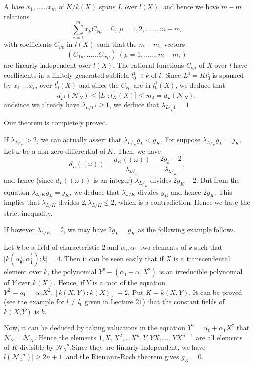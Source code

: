 A base $x_1, \ldots \ldots x_m$ of $K/{k(X)}$ spans $L$ over $l(X)$,
and hence we have $m - m_\circ$ relations 
$$
\sum^{m}_{\nu =1} x_\nu C_{\nu \mu} = 0, ~ \mu = 1, 2, \ldots\ldots , m-m_\circ
$$
with coefficients $C_{\nu \mu}$ in $l(X)$ such that the $m - m_\circ$
vectors 
$$
(C_{1 \mu}, \ldots\ldots C_{m \mu})~(\mu =1, \ldots\ldots ,
m-m_\circ)
$$ 
are linearly independent over $l(X)$. The rational
functions $C_{\nu \mu}$ of $X$ over $l$ have coefficients in a
finitely generated subfield $l^1_0 \supset k$ of $l$. Since $L^1 =
Kl^1_0$ is spanned by $x_1, \ldots x_m$ over $l^1_0(X)$ and
since the $C_{\nu \mu} $ are in $l^1_0(X)$, we deduce that 
$$
d_{L^1}(\mathscr{N}_X) \leq \bigg[L^1 : l^1_X (X)\bigg] \leq
m_0 = d_L (\mathscr{N}_X), 
$$
and\pageoriginale since we already have $\lambda_{L/L^1} \geq 1$, we deduce that
$\lambda_{L/_L1} = 1$. 

Our theorem is completely proved.
\begin{remark*}
  If $\lambda_{L/_K} > 2$, we can actually assert that
  $\lambda_{L/_{K}} g_L < g_K$. For suppose $\lambda_{L/_K} g_L =
  g_K$. Let $\omega$ be a non-zero differential of $K$. Then, we have 
  $$
  d_L((\omega)) = \frac{d_K((\omega))}{\lambda_{L/_K}}= \frac{2
    g_k -2}{\lambda_{L/_K}}, 
  $$
  and hence (since $d_L ((\omega))$ is an integer) $\lambda_{L/_K}$
  divides $2g_K -2$. But from the equation $\lambda_{L/K}g_L = g_K$,
  we deduce that $\lambda_{L/K}$ divides $g_K$ and hence $2g_K$. This
  implies that $\lambda_{L/K}$ divides $2, \lambda_{L/K} \leq 2$,
  which is a contradiction. Hence we have the strict inequality. 
\end{remark*}

If however $\lambda_{L/K} = 2$, we may have $2g_L = g_K$ as the
following example follows. 

Let $k$ be a field of characteristic $2$ and $\alpha_\circ, \alpha_1$
two elements of $k$ such that $\bigg [k \left(\alpha^{\frac{1}{2}}_0,
  \alpha^{\frac{1}{2}}_1\right) : k \bigg] = 4$. Then it can be seen easily
that if $X$ is a transcendental element over $k$, the polynomial $Y^2
- (\alpha_1 + \alpha_1 X^2)$ is an irreducible polynomial of $Y$ over
$k(X)$. Hence, if $Y$ is a root of the equation $Y^2 = \alpha_0 +
\alpha_1 X^2, [k (X, Y) : k(X)] = 2$. Put $K = k(X, Y)$. It can be
proved (see the example for $l \neq l_0 $ given in Lecture $21$)
that the constant fields of $k(X, Y)$ is $k$.  

Now, it can be deduced by taking valuations in the equation $Y^2 =
\alpha_0 + \alpha_1 X^2$ that $\mathscr{N}_Y = \mathscr{N}_X$. Hence
the elements  $1, X, X^2, \ldots X^n, Y, YX, \ldots$, $YX^{n-1}$ are all
elements of $K$ divisible by $\mathscr{N}^{-n}_X$.\pageoriginale Since they are
linearly independent, we have $l(\mathscr{N}^{-n}_X) ]\geq 2n+1$,
  and the Riemann-Roch theorem gives $g_K = 0$. 


